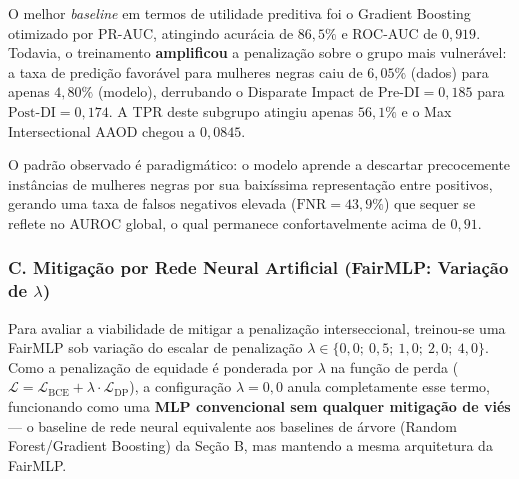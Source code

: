 O melhor \textit{baseline} em termos de utilidade preditiva foi o Gradient Boosting otimizado por PR-AUC, atingindo acurácia de $86,5\%$ e ROC-AUC de $0,919$. Todavia, o treinamento \textbf{amplificou} a penalização sobre o grupo mais vulnerável: a taxa de predição favorável para mulheres negras caiu de $6,05\%$ (dados) para apenas $4,80\%$ (modelo), derrubando o Disparate Impact de $\text{Pre-DI} = 0,185$ para $\text{Post-DI} = 0,174$. A TPR deste subgrupo atingiu apenas $56,1\%$ e o Max Intersectional AAOD chegou a $0,0845$.

\begin{table}[H]
    \centering
    \caption{Métricas de equidade interseccional pós-treino por subgrupo (Adult, GradientBoosting --- melhor baseline, média entre 3 folds externos).}
    \vspace{2mm}
    \label{tab:adult_subgroup_posttrain}
\end{table}

O padrão observado é paradigmático: o modelo aprende a descartar precocemente instâncias de mulheres negras por sua baixíssima representação entre positivos, gerando uma taxa de falsos negativos elevada ($\text{FNR} = 43,9\%$) que sequer se reflete no AUROC global, o qual permanece confortavelmente acima de $0,91$.

\subsubsection{C. Mitigação por Rede Neural Artificial (FairMLP: Variação de $\lambda$)}

Para avaliar a viabilidade de mitigar a penalização interseccional, treinou-se uma FairMLP sob variação do escalar de penalização $\lambda \in \{0,0;\ 0,5;\ 1,0;\ 2,0;\ 4,0\}$. Como a penalização de equidade é ponderada por $\lambda$ na função de perda ($\mathcal{L} = \mathcal{L}_{\text{BCE}} + \lambda \cdot \mathcal{L}_{\text{DP}}$), a configuração $\lambda = 0,0$ anula completamente esse termo, funcionando como uma \textbf{MLP convencional sem qualquer mitigação de viés} --- o baseline de rede neural equivalente aos baselines de árvore (Random Forest/Gradient Boosting) da Seção B, mas mantendo a mesma arquitetura da FairMLP.


